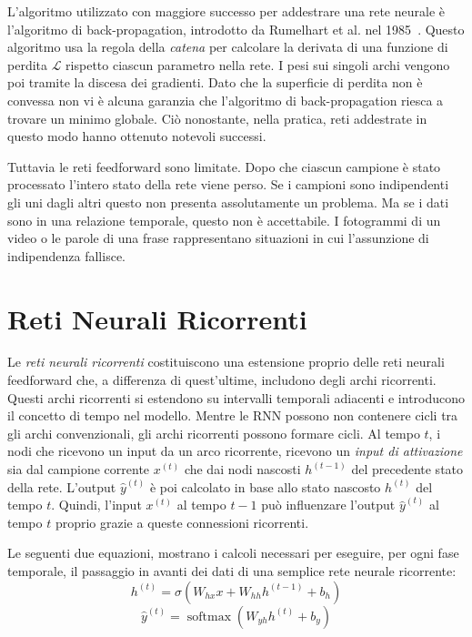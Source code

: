 L'algoritmo utilizzato con maggiore successo per addestrare una rete neurale \`e l'algoritmo di back-propagation, introdotto da Rumelhart et al. nel 1985~\cite{Rumelhart:1985}.
Questo algoritmo usa la regola della \emph{catena} per calcolare la derivata di una funzione di perdita $\mathcal{L}$ rispetto ciascun parametro nella rete.
I pesi sui singoli archi vengono poi tramite la discesa dei gradienti.
Dato che la superficie di perdita non \`e convessa non vi \`e alcuna garanzia che l'algoritmo di back-propagation riesca a trovare un minimo globale.
Ci\`o nonostante, nella pratica, reti addestrate in questo modo hanno ottenuto notevoli successi.

Tuttavia le reti feedforward sono limitate.
Dopo che ciascun campione \`e stato processato l'intero stato della rete viene perso.
Se i campioni sono indipendenti gli uni dagli altri questo non presenta assolutamente un problema.
Ma se i dati sono in una relazione temporale, questo non \`e accettabile.
I fotogrammi di un video o le parole di una frase rappresentano situazioni in cui l'assunzione di indipendenza fallisce.

\section{Reti Neurali Ricorrenti}
Le \emph{reti neurali ricorrenti} costituiscono una estensione proprio delle reti neurali feedforward che, a differenza di quest'ultime, includono degli archi ricorrenti.
Questi archi ricorrenti si estendono su intervalli temporali adiacenti e introducono il concetto di tempo nel modello.
Mentre le RNN possono non contenere cicli tra gli archi convenzionali, gli archi ricorrenti possono formare cicli.
Al tempo $t$, i nodi che ricevono un input da un arco ricorrente, ricevono un \emph{input di attivazione} sia dal campione corrente $x^{(t)}$ che dai nodi nascosti $h^{(t-1)}$ del precedente stato della rete.
L'output $\hat{y}^{(t)}$ \`e poi calcolato in base allo stato nascosto $h^{(t)}$ del tempo $t$.
Quindi, l'input $x^{(t)}$ al tempo $t-1$ pu\`o influenzare l'output $\hat{y}^{(t)}$ al tempo $t$ proprio grazie a queste connessioni ricorrenti.

Le seguenti due equazioni, mostrano i calcoli necessari per eseguire, per ogni fase temporale, il passaggio in avanti dei dati di una semplice rete neurale ricorrente:
\begin{equation}
  h^{(t)} = \sigma(W_{hx}x + W_{hh}h^{(t-1)} + b_h)
\end{equation}
\begin{equation}
  \hat{y}^{(t)} = \operatorname{softmax}(W_{yh}h^{(t)} + b_y)
\end{equation}


